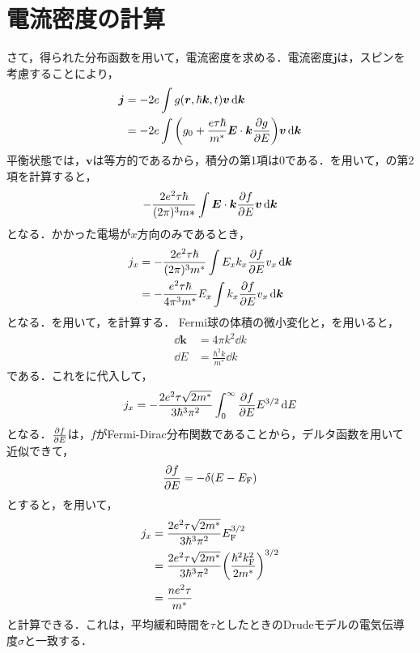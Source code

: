 \documentclass{report}
\begin{document}
    \section{電流密度の計算}
      さて，得られた分布函数を用いて，電流密度を求める．電流密度$\bm{j}$は，スピンを考慮することにより，
      \begin{align}
        \bm{j} &= -2e\int g(\bm{r}, \hbar\bm{k}, t)\bm{v}\dd{\bm{k}} \\ 
        &= -2e\int \qty(g_0 + \frac{e\tau\hbar}{m^*} \bm{E}\cdot\bm{k}\pdv{g}{E})\bm{v}\dd{\bm{k}} \label{current-density}
      \end{align}
      平衡状態では，$\bm{v}$は等方的であるから，積分の第1項は0である．を用いて，の第2項を計算すると，
      \begin{align}
        -\frac{2e^2\tau\hbar}{(2\pi)^3m*} \int \bm{E}\cdot \bm{k}\pdv{f}{E}\bm{v}\dd{\bm{k}}
      \end{align}
      となる．かかった電場が$x$方向のみであるとき，
      \begin{align}
        j_x &= -\frac{2e^2\tau\hbar}{(2\pi)^3m^*} \int E_xk_x\pdv{f}{E}v_x\dd{\bm{k}} \\ 
        &= -\frac{e^2\tau\hbar}{4\pi^3m^*}E_x\int k_x\pdv{f}{E}v_x\dd{\bm{k}} \label{current-density-x}
      \end{align}
      となる．を用いて，を計算する．
      Fermi球の体積の微小変化と，を用いると，
      \begin{align}
        \dd{\bm{k}} &= 4\pi k^2\dd{k} \\
        \dd{E} &= \frac{\hbar^2k}{m^*}\dd{k}
      \end{align}
      である．これをに代入して，
      \begin{align}
        j_x = -\frac{2 e^2\tau\sqrt{2m^*}}{3\hbar^3\pi^2}\int_{0}^{\infty} \pdv{f}{E}E^{3/2}\dd{E}
      \end{align}
      となる．$\pdv{f}{E}$は，$f$がFermi-Dirac分布関数であることから，デルタ函数を用いて近似できて，
      \begin{align}
        \pdv{f}{E} = -\delta(E - E_{\mathrm{F}})
      \end{align}
      とすると，を用いて，
      \begin{align}
        j_x &= \frac{2 e^2\tau\sqrt{2m^*}}{3\hbar^3\pi^2}E_{\mathrm{F}}^{3/2} \\ 
        &= \frac{2 e^2\tau\sqrt{2m^*}}{3\hbar^3\pi^2}\qty(\frac{\hbar^2k_{\mathrm{F}}^2}{2m^*})^{3/2} \\
        &= \frac{ne^2\tau}{m^*}
      \end{align}
      と計算できる．これは，平均緩和時間を$\tau$としたときのDrudeモデルの電気伝導度$\sigma$と一致する．
\end{document}
